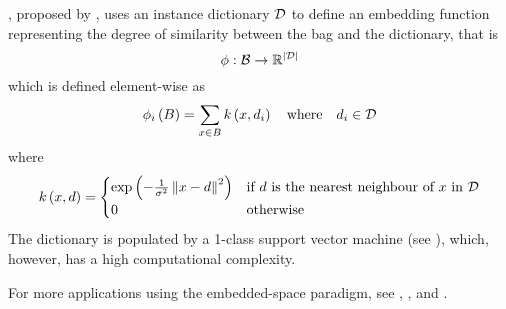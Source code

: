 , proposed by \cite{chen_miles:_2006}, uses an instance dictionary \( \mathcal{D} \) to define an embedding function representing the degree of similarity between the bag and the dictionary, that is
\[ \phi : \mathcal{B} \to \mathbb{R}^{\left\lvert \mathcal{D} \right\rvert} \]
which is defined element-wise as
\[ \phi_i \left( B \right) = \sum_{x \in B} k \left( x, d_i \right) \quad \text{where} \quad d_i \in \mathcal{D} \]
where
\[ k \left( x, d \right) = \begin{cases}
		\exp \left( - \frac{1}{\sigma^2} \left\lVert x - d \right\rVert^2 \right) &\text{if } d \text{ is the nearest neighbour of } x \text{ in } \mathcal{D} \\
		0 &\text{otherwise}
	\end{cases} \]
The dictionary is populated by a 1-class support vector machine (see \cite{zhu_1-norm_2004}), which, however, has a high computational complexity.

For more applications using the embedded-space paradigm, see \cite{cheplygina_multiple_2015}, \cite{chen_image_2004} \cite{foulds_learning_2008}, \cite{zhang_multi-instance_2009} and \cite{dedic_hierarchicke_2017}.

